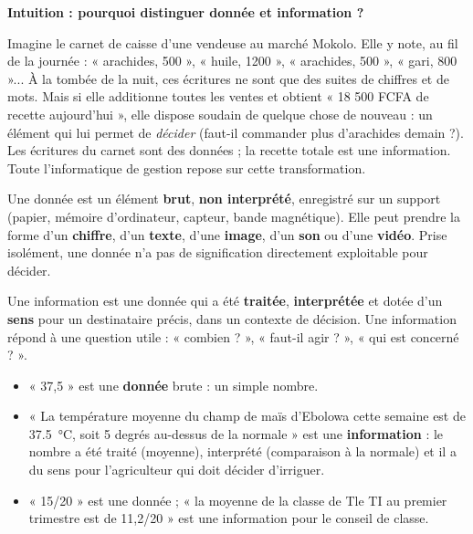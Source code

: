 \documentclass[11pt]{article}
\newcommand{\cle}[1]{{\popxbold\color{popdark}#1}}
\newcounter{popsec}
\newcounter{popsub}
\newcommand{\courssub}[1]{%
  \stepcounter{popsub}%
  \par\vspace{9pt}\noindent{\popxbold\fontsize{11.5}{13}\selectfont\color{popink}{\color{poporange}\thepopsec.\thepopsub}\hspace{6pt}#1}\par\nopagebreak\vspace{4pt}
}
\begin{document}
\courssub{De la donnée à l'information}

\textbf{Intuition : pourquoi distinguer donnée et information ?}\par

Imagine le carnet de caisse d'une vendeuse au marché Mokolo. Elle y note, au fil de la journée : « arachides, 500 », « huile, 1200 », « arachides, 500 », « gari, 800 »... À la tombée de la nuit, ces écritures ne sont que des suites de chiffres et de mots. Mais si elle additionne toutes les ventes et obtient « 18 500 FCFA de recette aujourd'hui », elle dispose soudain de quelque chose de nouveau : un élément qui lui permet de \emph{décider} (faut-il commander plus d'arachides demain ?). Les écritures du carnet sont des \cle{données} ; la recette totale est une \cle{information}. Toute l'informatique de gestion repose sur cette transformation.

\begin{definition}[Donnée]
Une \cle{donnée} est un élément \textbf{brut}, \textbf{non interprété}, enregistré sur un support (papier, mémoire d'ordinateur, capteur, bande magnétique). Elle peut prendre la forme d'un \textbf{chiffre}, d'un \textbf{texte}, d'une \textbf{image}, d'un \textbf{son} ou d'une \textbf{vidéo}. Prise isolément, une donnée n'a pas de signification directement exploitable pour décider.
\end{definition}

\begin{definition}[Information]
Une \cle{information} est une donnée qui a été \textbf{traitée}, \textbf{interprétée} et dotée d'un \textbf{sens} pour un destinataire précis, dans un contexte de décision. Une information répond à une question utile : « combien ? », « faut-il agir ? », « qui est concerné ? ».
\end{definition}

\begin{exemplebox}
\begin{itemize}
\item « 37,5 » est une \textbf{donnée} brute : un simple nombre.
\item « La température moyenne du champ de maïs d'Ebolowa cette semaine est de \SI{37,5}{\celsius}, soit 5 degrés au-dessus de la normale » est une \textbf{information} : le nombre a été traité (moyenne), interprété (comparaison à la normale) et il a du sens pour l'agriculteur qui doit décider d'irriguer.
\item « 15/20 » est une donnée ; « la moyenne de la classe de Tle TI au premier trimestre est de 11,2/20 » est une information pour le conseil de classe.
\end{itemize}
\end{exemplebox}
\end{document}
